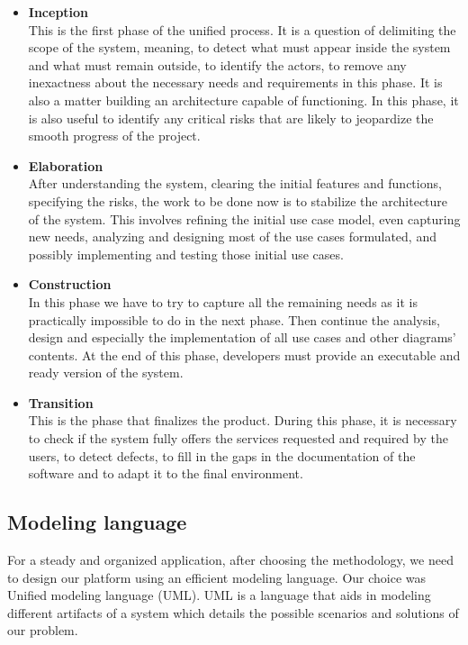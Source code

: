 \begin{itemize}
    \item \textbf{Inception}\\
    This is the first phase of the unified process. It is a question of delimiting the scope of the system, meaning, to detect what must appear inside the system and what must remain outside, to identify the actors, to remove any inexactness about the necessary needs and requirements in this phase. It is also a matter building an architecture capable of functioning. In this phase, it is also useful to identify any critical risks that are likely to jeopardize the smooth progress of the project.
    \item \textbf{Elaboration}\\
    After understanding the system, clearing the initial features and functions, specifying the risks, the work to be done now is to stabilize the architecture of the system. This involves refining the initial use case model, even capturing new needs, analyzing and designing most of the use cases formulated, and possibly implementing and testing those initial use cases.
    \item \textbf{Construction}\\
    In this phase we have to try to capture all the remaining needs as it is practically impossible to do in the next phase. Then continue the analysis, design and especially the implementation of all use cases and other diagrams' contents. At the end of this phase, developers must provide an executable and ready version of the system.
    \item \textbf{Transition}\\
    This is the phase that finalizes the product. During this phase, it is necessary to check if the system fully offers the services requested and required by the users, to detect defects, to fill in the gaps in the documentation of the software and to adapt it to the final environment.
\end{itemize}

\subsection{Modeling language}
For a steady and organized application, after choosing the methodology, we need to design our platform using an efficient modeling language. Our choice was Unified modeling language (UML). UML is a language that aids in modeling different artifacts of a system which details the possible scenarios and solutions of our problem.

